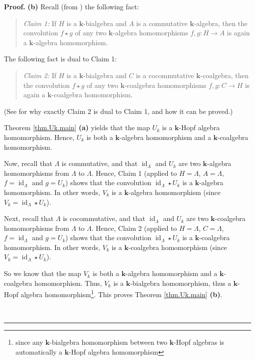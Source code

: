 \documentclass[numbers=enddot,12pt,final,onecolumn,notitlepage]{scrartcl}%
\theoremstyle{definition}
\newenvironment{statement}{\begin{quote}}{\end{quote}}
\newenvironment{proof}[1][Proof]{\noindent\textbf{#1.} }{\ \rule{0.5em}{0.5em}}
\begin{document}
\begin{proof}
\textbf{(b)} Recall (from \cite[Exercise 1.5.11(a)]{GriRei}) the following fact:

\begin{statement}
\textit{Claim 1:} If $H$ is a $\mathbf{k}$-bialgebra and $A$ is a commutative
$\mathbf{k}$-algebra, then the convolution $f\star g$ of any two $\mathbf{k}%
$-algebra homomorphisms $f,g:H\rightarrow A$ is again a $\mathbf{k}$-algebra homomorphism.
\end{statement}

The following fact is dual to Claim 1:

\begin{statement}
\textit{Claim 2:} If $H$ is a $\mathbf{k}$-bialgebra and $C$ is a
cocommutative $\mathbf{k}$-coalgebra, then the convolution $f\star g$ of any
two $\mathbf{k}$-coalgebra homomorphisms $f,g:C\rightarrow H$ is again a
$\mathbf{k}$-coalgebra homomorphism.
\end{statement}

(See \cite[solution to Exercise 1.5.11(h)]{GriRei} for why exactly Claim 2 is
dual to Claim 1, and how it can be proved.)

Theorem \ref{thm.Uk.main} \textbf{(a)} yields that the map $U_{k}$ is a
$\mathbf{k}$-Hopf algebra homomorphism. Hence, $U_{k}$ is both a $\mathbf{k}%
$-algebra homomorphism and a $\mathbf{k}$-coalgebra homomorphism.

Now, recall that $\Lambda$ is commutative, and that $\operatorname*{id}%
\nolimits_{\Lambda}$ and $U_{k}$ are two $\mathbf{k}$-algebra homomorphisms
from $\Lambda$ to $\Lambda$. Hence, Claim 1 (applied to $H=\Lambda$,
$A=\Lambda$, $f=\operatorname*{id}\nolimits_{\Lambda}$ and $g=U_{k}$) shows
that the convolution $\operatorname*{id}\nolimits_{\Lambda}\star U_{k}$ is a
$\mathbf{k}$-algebra homomorphism. In other words, $V_{k}$ is a $\mathbf{k}%
$-algebra homomorphism (since $V_{k}=\operatorname*{id}\nolimits_{\Lambda
}\star U_{k}$).

Next, recall that $\Lambda$ is cocommutative, and that $\operatorname*{id}%
\nolimits_{\Lambda}$ and $U_{k}$ are two $\mathbf{k}$-coalgebra homomorphisms
from $\Lambda$ to $\Lambda$. Hence, Claim 2 (applied to $H=\Lambda$,
$C=\Lambda$, $f=\operatorname*{id}\nolimits_{\Lambda}$ and $g=U_{k}$) shows
that the convolution $\operatorname*{id}\nolimits_{\Lambda}\star U_{k}$ is a
$\mathbf{k}$-coalgebra homomorphism. In other words, $V_{k}$ is a $\mathbf{k}%
$-coalgebra homomorphism (since $V_{k}=\operatorname*{id}\nolimits_{\Lambda
}\star U_{k}$).

So we know that the map $V_{k}$ is both a $\mathbf{k}$-algebra homomorphism
and a $\mathbf{k}$-coalgebra homomorphism. Thus, $V_{k}$ is a $\mathbf{k}%
$-bialgebra homomorphism, thus a $\mathbf{k}$-Hopf algebra
homomorphism\footnote{since any $\mathbf{k}$-bialgebra homomorphism between
two $\mathbf{k}$-Hopf algebras is automatically a $\mathbf{k}$-Hopf algebra
homomorphism}. This proves Theorem \ref{thm.Uk.main} \textbf{(b)}.


\end{proof}
\end{document}
